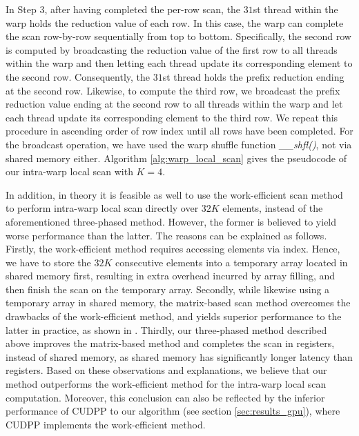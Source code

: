 \documentclass[article]{elsarticle}
\renewcommand{\hl}[1]{#1}
\begin{document}
{\hl{In Step 3}, after having completed the per-row scan, the $31$st thread within the warp holds the reduction value of each row. In this case, the warp can complete the scan row-by-row sequentially from top to bottom. Specifically, the second row is computed by broadcasting the reduction value of the first row to all threads within the warp and then letting each thread update its corresponding element to the second row. Consequently, the $31$st thread holds the prefix reduction ending at the second row. Likewise, to compute the third row, we broadcast the prefix reduction value ending at the second row to all threads within the warp and let each thread update its corresponding element to the third row. We repeat this procedure in ascending order of row index until all rows have been completed. For the broadcast operation, we have used the warp shuffle function \textit{\_\_shfl()}, not via shared memory either. Algorithm \ref{alg:warp_local_scan} gives the pseudocode of our intra-warp local scan with $K=4$.

\hl{In addition, in theory it is feasible as well to use the work-efficient scan method to perform intra-warp local scan directly over $32K$ elements, instead of the aforementioned three-phased method. However, the former is believed to yield worse performance than the latter. The reasons can be explained as follows. Firstly, the work-efficient method requires accessing elements via index. Hence, we have to store the $32K$ consecutive elements into a temporary array located in shared memory first, resulting in extra overhead incurred by array filling, and then finish the scan on the temporary array. Secondly, while likewise using a temporary array in shared memory, the matrix-based scan method overcomes the drawbacks of the work-efficient method, and yields superior performance to the latter in practice, as shown in \cite{dotsenko2008fast}. Thirdly, our three-phased method described above improves the matrix-based method and completes the scan in registers, instead of shared memory, as shared memory has significantly longer latency than registers. Based on these observations and explanations, we believe that our method outperforms the work-efficient method for the intra-warp local scan computation. Moreover, this conclusion can also be reflected by the inferior performance of CUDPP to our algorithm (see section \ref{sec:results_gpu}), where CUDPP implements the work-efficient method.}
}
\end{document}

